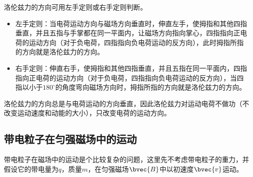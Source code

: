 洛伦兹力的方向可用左手定则或右手定则判断。

\begin{itemize}
\item 左手定则：当电荷运动方向与磁场方向垂直时，伸直左手，使拇指和其他四指垂直，并且五指与手掌都在同一平面内，让磁场方向指向掌心，四指指向正电荷的运动方向（对于负电荷，四指指向负电荷运动的反方向），此时拇指所指的方向就是洛伦兹力的方向。
\item 右手定则：伸直右手，使拇指和其他四指垂直，并且五指在同一平面内，四指指向正电荷的运动方向（对于负电荷，四指指向负电荷运动的反方向），当四指以小于$180^\circ$的角度弯向磁场方向时，拇指所指的方向就是洛伦兹力的方向。
\end{itemize}

洛伦兹力的方向总是与电荷运动的方向垂直，因此洛伦兹力对运动电荷不做功（不改变运动速度和动能的大小），只改变电荷的运动方向。

\subsection{带电粒子在匀强磁场中的运动}

带电粒子在磁场中的运动是个比较复杂的问题，这里先不考虑带电粒子的重力，并假设它的带电量为$q$，质量$m$，在匀强磁场$\bvec{B}$中以初速度$\bvec{v}$运动。